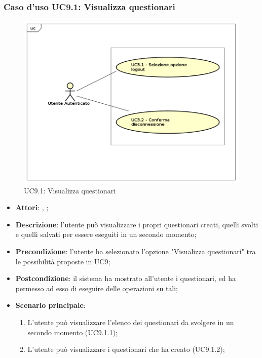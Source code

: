 	\subsubsection{Caso d'uso UC9.1: Visualizza questionari}
	\label{UC9.1}
	\begin{figure}[h]
		\centering
	\includegraphics[scale=0.7,keepaspectratio]{UML/UC9.png}
		\caption{UC9.1: Visualizza questionari}
	\end{figure}
	\FloatBarrier
	\begin{itemize}
		\item \textbf{Attori}: \uau, \uaupro;
		\item \textbf{Descrizione}: l'utente può visualizzare i propri questionari creati, quelli svolti e quelli salvati per essere eseguiti in un secondo momento; 
		\item \textbf{Precondizione}: l'utente ha selezionato l'opzione "Visualizza questionari" tra le possibilità proposte in UC9;
		\item \textbf{Postcondizione}: il sistema ha mostrato all'utente i questionari, ed ha permesso ad esso di eseguire delle operazioni su tali; 
		\item \textbf{Scenario principale}: 
			\begin{enumerate}
				\item L'utente può visualizzare l'elenco dei questionari da svolgere in un secondo momento (UC9.1.1);
				\item L'utente può visualizzare i questionari che ha creato (UC9.1.2); 
			\end{enumerate}
	\end{itemize}
	
